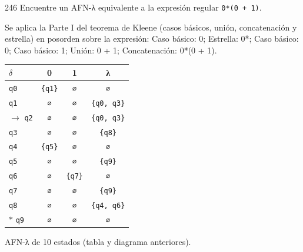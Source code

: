 \documentclass[11pt]{article}
\begin{document}
\begin{ejercicio}{246}{}
Encuentre un AFN-λ equivalente a la expresión regular \texttt{0*(0 + 1)}.
\end{ejercicio}
\proc Se aplica la Parte I del teorema de Kleene (casos básicos, unión, concatenación y estrella) en posorden sobre la expresión: Caso básico: 0; Estrella: 0*; Caso básico: 0; Caso básico: 1; Unión: 0 + 1; Concatenación: 0*(0 + 1).
\begin{center}\small\begin{tabular}{lccc}\toprule
$\delta$ & 0 & 1 & λ \\\midrule
 \texttt{q0} & \texttt{\{q1\}} & \texttt{∅} & \texttt{∅} \\
 \texttt{q1} & \texttt{∅} & \texttt{∅} & \texttt{\{q0, q3\}} \\
$\to$ \texttt{q2} & \texttt{∅} & \texttt{∅} & \texttt{\{q0, q3\}} \\
 \texttt{q3} & \texttt{∅} & \texttt{∅} & \texttt{\{q8\}} \\
 \texttt{q4} & \texttt{\{q5\}} & \texttt{∅} & \texttt{∅} \\
 \texttt{q5} & \texttt{∅} & \texttt{∅} & \texttt{\{q9\}} \\
 \texttt{q6} & \texttt{∅} & \texttt{\{q7\}} & \texttt{∅} \\
 \texttt{q7} & \texttt{∅} & \texttt{∅} & \texttt{\{q9\}} \\
 \texttt{q8} & \texttt{∅} & \texttt{∅} & \texttt{\{q4, q6\}} \\
$*$ \texttt{q9} & \texttt{∅} & \texttt{∅} & \texttt{∅} \\
\bottomrule\end{tabular}\end{center}

\resp AFN-λ de 10 estados (tabla y diagrama anteriores).
\end{document}
